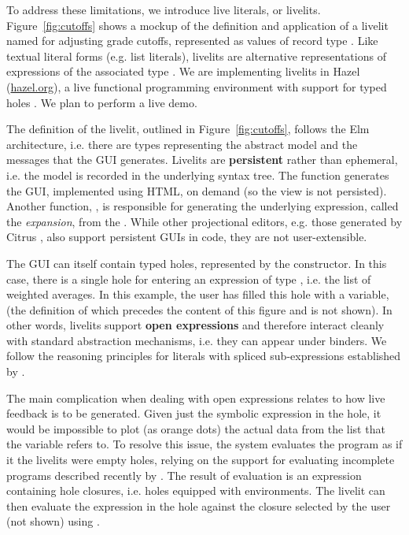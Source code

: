 To address these limitations, we introduce live literals, or livelits. Figure~\ref{fig:cutoffs} shows a mockup of the definition and application of a livelit named  for adjusting grade cutoffs, represented as values of  record type . Like textual literal forms (e.g. list literals), livelits are alternative representations of expressions of the associated type \cite{DBLP:journals/pacmpl/OmarA18}. %
We are implementing livelits in Hazel (\url{hazel.org}), a live functional programming environment with support for typed holes \cite{popl-paper}. We plan to perform a live demo.




The definition of
the livelit, outlined in Figure~\ref{fig:cutoffs}, follows the Elm architecture,
i.e. there are types representing the abstract model and the messages that the 
GUI generates. Livelits are \textbf{persistent} rather than ephemeral, i.e. the model is recorded in the underlying syntax tree. The  function generates the GUI, implemented using HTML, on demand (so the view is not persisted). Another function, , is responsible for generating the underlying expression, called the \emph{expansion}, from the . 
While other projectional editors, e.g. those generated by Citrus \cite{DBLP:conf/uist/KoM05}, also support persistent GUIs in code, they are not user-extensible. 

The GUI can itself contain typed holes, represented by the  constructor. In this case, there is a single hole
for entering an expression of type , i.e. the list of weighted
averages. In this example, the user has filled this hole with a variable,
 (the definition of which precedes the content of this figure and is not shown). In other words,
livelits support \textbf{open expressions} and therefore interact cleanly with 
standard abstraction mechanisms, i.e. they can appear under binders. We follow the reasoning principles for literals with spliced sub-expressions established  by \citet{DBLP:journals/pacmpl/OmarA18}.

The main complication when dealing with open expressions relates to how live feedback
is to be generated. Given just the symbolic expression in the hole, it would be 
impossible to plot (as orange dots) the actual data from the list that the variable refers to. To resolve this issue, the system evaluates the program 
as if it the livelits were empty holes, 
relying on the support for evaluating incomplete programs described recently 
by \citet{DBLP:journals/pacmpl/OmarVCH19}. The result of evaluation is an expression containing
hole closures, i.e. holes equipped with environments. 
The livelit 
can then evaluate the expression in the hole against the closure selected by the user (not shown) using .


